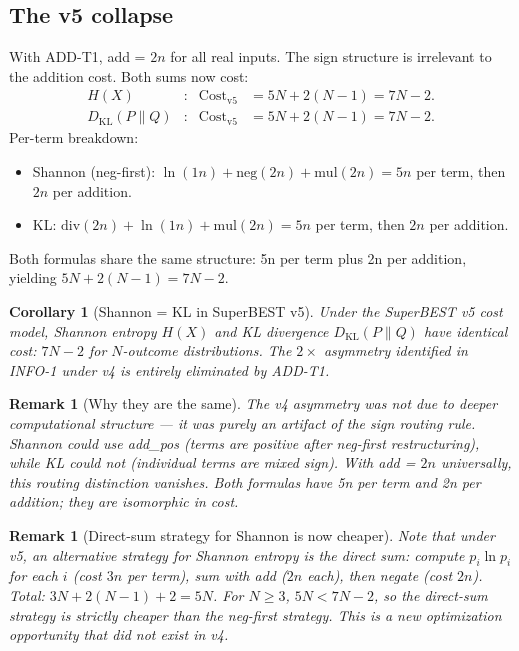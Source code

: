 \documentclass[12pt,a4paper]{article}
\newtheorem{corollary}[theorem]{Corollary}
\newtheorem{remark}[theorem]{Remark}
\theoremstyle{definition}
\newcommand{\Cost}{\mathrm{Cost}}
\begin{document}
\subsection*{The v5 collapse}

With ADD-T1, add = $2n$ for all real inputs.  The sign structure is irrelevant
to the addition cost.  Both sums now cost:
\begin{align*}
  H(X)         &\colon & \Cost_{\mathrm{v5}} &= 5N + 2(N-1) = 7N - 2. \\
  D_{\mathrm{KL}}(P\|Q) &\colon & \Cost_{\mathrm{v5}} &= 5N + 2(N-1) = 7N - 2.
\end{align*}
Per-term breakdown:
\begin{itemize}
  \item Shannon (neg-first): $\ln(1n) + \mathrm{neg}(2n) + \mathrm{mul}(2n) = 5n$ per term,
        then $2n$ per addition.
  \item KL: $\mathrm{div}(2n) + \ln(1n) + \mathrm{mul}(2n) = 5n$ per term,
        then $2n$ per addition.
\end{itemize}
Both formulas share the same structure: 5n per term plus 2n per addition,
yielding $5N + 2(N-1) = 7N - 2$.

\begin{corollary}[Shannon = KL in SuperBEST v5]
Under the SuperBEST v5 cost model, Shannon entropy $H(X)$ and KL divergence
$D_{\mathrm{KL}}(P\|Q)$ have identical cost: $7N - 2$ for $N$-outcome distributions.
The $2\times$ asymmetry identified in INFO-1 under v4 is entirely eliminated
by ADD-T1.
\end{corollary}

\begin{remark}[Why they are the same]
The v4 asymmetry was \emph{not} due to deeper computational structure ---
it was purely an artifact of the sign routing rule.
Shannon could use add\_pos (terms are positive after neg-first restructuring),
while KL could not (individual terms are mixed sign).
With add = $2n$ universally, this routing distinction vanishes.
Both formulas have 5n per term and 2n per addition; they are isomorphic in cost.
\end{remark}

\begin{remark}[Direct-sum strategy for Shannon is now cheaper]
Note that under v5, an alternative strategy for Shannon entropy is the
\emph{direct sum}: compute $p_i \ln p_i$ for each $i$ (cost $3n$ per term),
sum with add ($2n$ each), then negate (cost $2n$).  Total: $3N + 2(N-1) + 2 = 5N$.
For $N \geq 3$, $5N < 7N - 2$, so the direct-sum strategy is strictly cheaper
than the neg-first strategy.  This is a new optimization opportunity that did
not exist in v4.
\end{remark}
\end{document}
